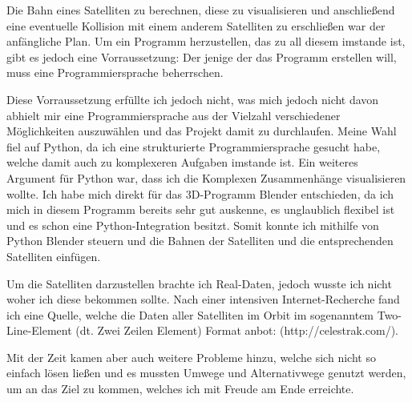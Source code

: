 Die Bahn eines Satelliten zu berechnen, diese zu visualisieren und anschließend eine eventuelle
Kollision mit einem anderem Satelliten zu erschließen war der anfängliche Plan.
Um ein Programm herzustellen, das zu all diesem imstande ist, gibt es jedoch eine Vorraussetzung:
Der jenige der das Programm erstellen will, muss eine Programmiersprache beherrschen.
\par
Diese Vorraussetzung erfüllte ich jedoch nicht, was mich jedoch nicht davon abhielt mir eine
Programmiersprache aus der Vielzahl verschiedener Möglichkeiten auszuwählen und das Projekt damit zu durchlaufen.
Meine Wahl fiel auf Python, da ich eine strukturierte Programmiersprache gesucht habe,
welche damit auch zu komplexeren Aufgaben imstande ist.
Ein weiteres Argument für Python war, dass ich die Komplexen Zusammenhänge visualisieren wollte. Ich habe mich direkt
für das 3D-Programm Blender entschieden, da ich mich in diesem Programm bereits sehr gut
auskenne, es unglaublich flexibel ist und es schon eine Python-Integration besitzt.
Somit konnte ich mithilfe von Python Blender steuern und die Bahnen der Satelliten und die
entsprechenden Satelliten einfügen. 
\par
Um die Satelliten darzustellen brachte ich Real-Daten, jedoch wusste ich
nicht woher ich diese bekommen sollte. Nach einer intensiven Internet-Recherche fand ich eine
Quelle, welche die Daten aller Satelliten im Orbit im sogenanntem Two-Line-Element (dt. Zwei Zeilen Element) Format anbot:
(http://celestrak.com/).
\par
Mit der Zeit kamen aber auch weitere Probleme hinzu, welche sich nicht so einfach lösen ließen und es
mussten Umwege und Alternativwege genutzt werden, um an das Ziel zu kommen, welches ich mit
Freude am Ende erreichte.



